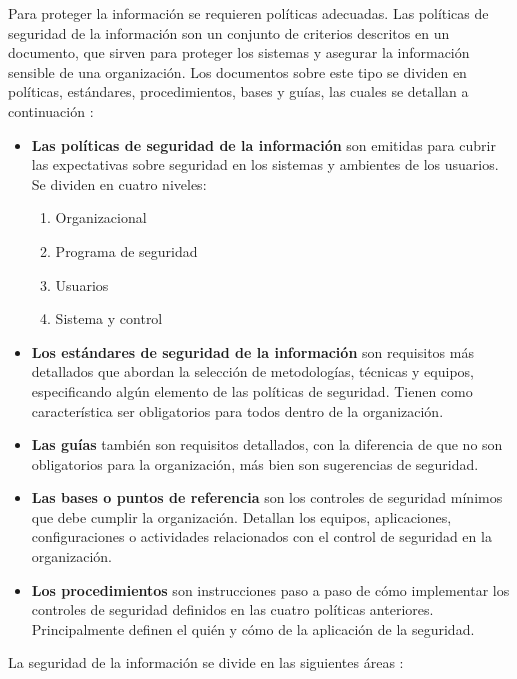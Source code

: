 Para proteger la información se requieren políticas adecuadas. Las políticas de seguridad de la información son un conjunto de criterios descritos en un documento, que sirven para proteger los sistemas y asegurar la información sensible de una organización. Los documentos sobre este tipo se dividen en políticas, estándares, procedimientos, bases y guías, las cuales se detallan a continuación \cite{peltier2016information,Lan17}: 

\begin{itemize}[noitemsep]
\item \textbf{Las políticas de seguridad de la información} son emitidas para cubrir las expectativas sobre seguridad en los sistemas y ambientes de los usuarios. Se dividen en cuatro niveles: 

\begin{enumerate}[noitemsep]
	\item Organizacional
	\item Programa de seguridad
	\item Usuarios
	\item Sistema y control
\end{enumerate}

\item \textbf{Los estándares de seguridad de la información} son requisitos más detallados que abordan la selección de metodologías, técnicas y equipos, especificando algún elemento de las políticas de seguridad. Tienen como característica ser obligatorios para todos dentro de la organización.

\item \textbf{Las guías} también son requisitos detallados, con la diferencia de que no son obligatorios para la organización, más bien son sugerencias de seguridad.

\item \textbf{Las bases o puntos de referencia} son los controles de seguridad mínimos que debe cumplir la organización. Detallan los equipos, aplicaciones, configuraciones o actividades relacionados con el control de seguridad en la organización.

\item \textbf{Los procedimientos} son instrucciones paso a paso de cómo implementar los controles de seguridad definidos en las cuatro políticas anteriores. Principalmente definen el quién y cómo de la aplicación de la seguridad. 

\end{itemize}

La seguridad de la información se divide en las siguientes áreas \cite{jacobs2015engineering}:

